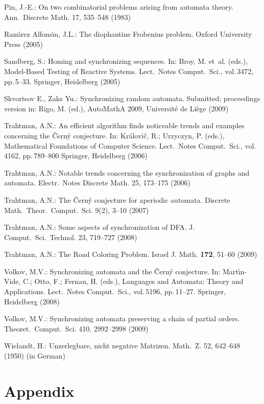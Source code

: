 \documentclass[11pt]{llncs}
\begin{document}
\begin{thebibliography}{99}
Pin, J.-E.: On two combinatorial problems arising from automata
theory. Ann.\ Discrete Math. 17, 535--548 (1983)

Ram\'{\i}rez Alfons\'{\i}n, J.L.: The diophantine Frobenius problem.
Oxford University Press (2005)

Sandberg, S.: Homing and synchronizing sequences. In: Broy, M.
et~al. (eds.), Model-Based Testing of Reactive Systems. Lect.\
Notes Comput.\ Sci., vol.\,3472, pp.\,5--33. Springer, Heidelberg
(2005)

Skvortsov E., Zaks Yu.: Synchronizing random automata. Submitted;
proceedings version in: Rigo, M. (ed.), AutoMathA 2009, Universit\'e
de Li\`ege (2009)

Trahtman, A.N.: An efficient algorithm finds noticeable trends
and examples concerning the \v{C}ern\'y conjecture. In:
Kr\'alovi\v{c}, R.; Urzyczyn, P. (eds.), Mathematical Foundations
of Computer Science. Lect.\ Notes Comput.\ Sci., vol.\,4162, pp.\,789--800
Springer, Heidelberg (2006)

Trahtman, A.N.: Notable trends concerning the synchronization
of graphs and automata. Electr.\ Notes Discrete Math. 25, 173--175 (2006)

Trahtman, A.N.: The \v{C}ern\'y conjecture for aperiodic automata.
Discrete Math.\ Theor.\ Comput.\ Sci. 9(2), 3--10 (2007)

Trahtman, A.N.: Some aspects of synchronization of DFA. J. Comput.\ Sci.\
Technol. 23, 719--727 (2008)

Trahtman, A.N.: The Road Coloring Problem. Israel J. Math.
\textbf{172}, 51--60 (2009)

Volkov, M.V.: Synchronizing automata and the \v{C}ern\'{y}
conjecture. In: Mart\'\i{}n-Vide, C.; Otto, F.; Fernau, H. (eds.),
Languages and Automata: Theory and Applications. Lect.\ Notes
Comput.\ Sci., vol.\,5196, pp.\,11--27.  Springer, Heidelberg (2008)

\bibitem{Vo09}
Volkov, M.V.: Synchronizing automata preserving a chain of partial
orders. Theoret.\ Comput.\ Sci. 410, 2992--2998 (2009)

Wielandt, H.: Unzerlegbare, nicht negative Matrizen. Math.\ Z.
52, 642--648 (1950) (in German)
\end{thebibliography}


\section*{Appendix}
\end{document}
